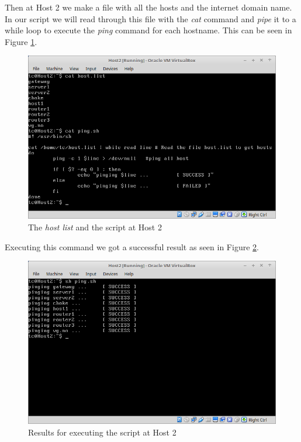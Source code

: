\documentclass{article}
\begin{document}
Then at Host 2 we make a file with all the hosts and the internet domain name. In our script we will read through this file with the \textit{cat} command and \textit{pipe} it to a while loop to execute the \textit{ping} command for each hostname. This can be seen in Figure \ref{fig:host2-file}. 
\begin{figure}[!h]
    \centering
    \includegraphics[scale=0.4]{host2-ping-file}
    \caption{The \textit{host list} and the script at Host 2}
    \label{fig:host2-file}
\end{figure}

Executing this command we got a successful result as seen in Figure \ref{fig:host2-pinging}.

\begin{figure}[!h]
    \centering
    \includegraphics[scale=0.3]{host2-pinging}
    \caption{Results for executing the script at Host 2}
    \label{fig:host2-pinging}
\end{figure}
\end{document}
